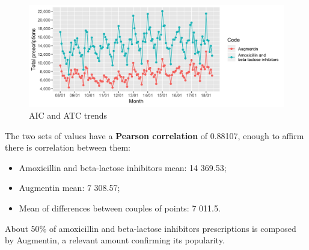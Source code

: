 \begin{figure}[h]
	\centering
	\includegraphics[scale=0.3]{../plots/atc_aic-month.png}
	\caption{\small AIC and ATC trends}
\end{figure}

The two sets of values have a \textbf{Pearson correlation} of 0.88107, enough to affirm there is correlation between them:
\begin{itemize}
	\item Amoxicillin and beta-lactose inhibitors mean: 14 369.53;
	\item Augmentin mean: 7 308.57;
	\item Mean of differences between couples of points: 7 011.5.
\end{itemize}

About 50\% of amoxicillin and beta-lactose inhibitors prescriptions is composed by Augmentin, a relevant amount confirming its popularity.
